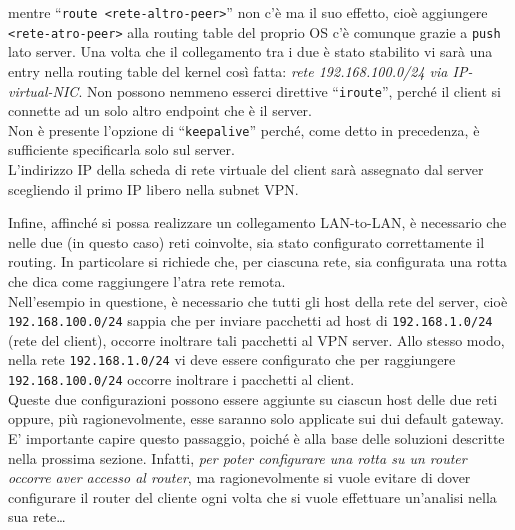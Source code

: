 mentre ``\texttt{route <rete-altro-peer>}'' non c'è ma il suo effetto, cioè aggiungere
\texttt{<rete-atro-peer>} alla routing table del proprio OS c'è comunque grazie a \texttt{push}
lato server.
Una volta che il collegamento tra i due è stato stabilito vi sarà una entry
nella routing table del kernel così fatta: \textit{rete 192.168.100.0/24 via
	IP-virtual-NIC}. Non possono nemmeno esserci direttive ``\texttt{iroute}'', perché
il client si connette ad un solo altro endpoint che è il server.\\
Non è presente l'opzione di ``\texttt{keepalive}'' perché, come detto in
precedenza, è sufficiente specificarla solo sul server.\\
L'indirizzo IP della scheda di rete virtuale del client sarà assegnato dal server scegliendo
il primo IP libero nella subnet VPN.


Infine, affinché si possa realizzare un collegamento LAN-to-LAN, è necessario che
nelle due (in questo caso) reti coinvolte, sia stato configurato correttamente
il routing. In particolare si richiede che, per ciascuna rete, sia configurata una rotta
che dica come raggiungere l'atra rete remota.\\
Nell'esempio in questione, è necessario che tutti gli host della rete del server, cioè
\texttt{192.168.100.0/24} sappia che per inviare pacchetti ad host di \texttt{192.168.1.0/24}
(rete del client), occorre inoltrare tali pacchetti al VPN server. Allo stesso modo,
nella rete \texttt{192.168.1.0/24} vi deve essere configurato che per raggiungere
\texttt{192.168.100.0/24} occorre inoltrare i pacchetti al client.\\
Queste due configurazioni possono essere aggiunte su ciascun host delle due reti oppure,
più ragionevolmente, esse saranno solo applicate sui dui default gateway. E' importante
capire questo passaggio, poiché è alla base delle soluzioni descritte nella prossima
sezione. Infatti, \textit{per poter configurare una rotta su un router occorre aver
accesso al router}, ma ragionevolmente si vuole evitare di dover configurare
il router del cliente ogni volta che si vuole effettuare un'analisi nella sua rete\ldots




